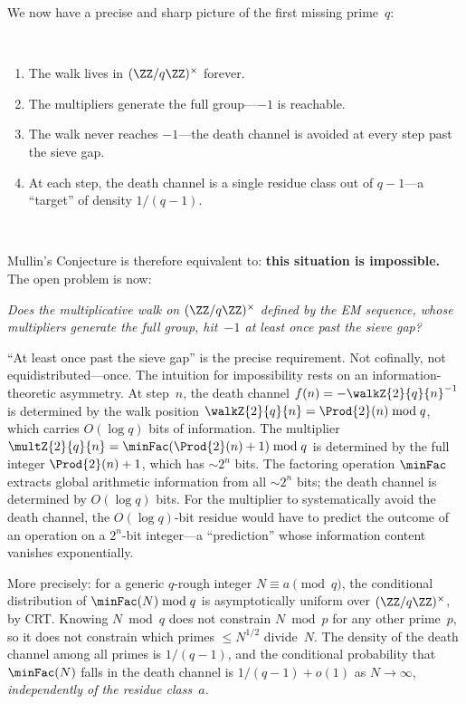We now have a precise and sharp picture of the first missing prime~$q$:

\

\begin{enumerate}[nosep]
\item The walk lives in $(\ZZ/q\ZZ)^\times$ forever.
\item The multipliers generate the full group---$-1$ is reachable.
\item The walk never reaches $-1$---the death channel is avoided at
  every step past the sieve gap.
\item At each step, the death channel is a single residue class out
  of $q - 1$---a ``target'' of density $1/(q-1)$.
\end{enumerate}

\

\noindent Mullin's Conjecture is therefore equivalent to: \textbf{this situation
is impossible.}  The open problem is now:

\begin{center}
\emph{Does the multiplicative walk on $(\ZZ/q\ZZ)^\times$ defined by
the EM sequence, whose multipliers generate the full group, hit~$-1$
at least once past the sieve gap?}
\end{center}

``At least once past the sieve gap'' is the precise requirement.  Not
cofinally, not equidistributed---once.
The intuition for impossibility rests on an information-theoretic
asymmetry.  At step~$n$, the death channel
$f(n) = -\walkZ{2}{q}{n}^{-1}$ is determined by the walk position
$\walkZ{2}{q}{n} = \Prod{2}(n) \bmod q$, which carries $O(\log q)$ bits of
information.  The multiplier
$\multZ{2}{q}{n} = \minFac(\Prod{2}(n)+1) \bmod q$ is determined by the
full integer $\Prod{2}(n)+1$, which has $\sim 2^n$ bits.  The factoring
operation $\minFac$ extracts global arithmetic information from all
$\sim 2^n$ bits; the death channel is determined by $O(\log q)$ bits.
For the multiplier to systematically avoid the death channel, the
$O(\log q)$-bit residue would have to predict the outcome of an
operation on a $2^n$-bit integer---a ``prediction'' whose information
content vanishes exponentially.

More precisely: for a generic $q$-rough integer $N \equiv a \pmod{q}$,
the conditional distribution of $\minFac(N) \bmod q$ is
asymptotically uniform over $(\ZZ/q\ZZ)^\times$, by CRT\@.  Knowing
$N \bmod q$ does not constrain $N \bmod p$ for any other prime~$p$,
so it does not constrain which primes $\leq N^{1/2}$ divide~$N$.  The
density of the death channel among all primes is $1/(q-1)$, and the
conditional probability that $\minFac(N)$ falls in the death channel
is $1/(q-1) + o(1)$ as $N \to \infty$, \emph{independently of the
residue class~$a$}.

